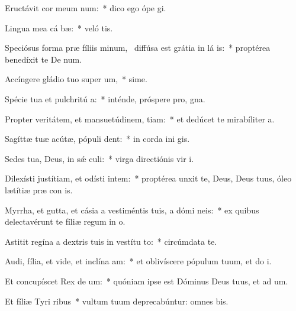 \item Eructávit cor meum  num:~* dico ego ópe  gi.
\item Lingua mea cá bæ:~* veló tis.
\item Speciósus forma præ fíliis minum,~\pscross{} diffúsa est grátia in lá is:~* proptérea benedíxit te De  num.
\item Accíngere gládio tuo super  um,~* sime.
\item Spécie tua et pulchritú a:~* inténde, próspere pro,  gna.
\item Propter veritátem, et mansuetúdinem,  tiam:~* et dedúcet te mirabíliter  a.
\item Sagíttæ tuæ acútæ, pópuli   dent:~* in corda ini gis.
\item Sedes tua, Deus, in sǽ culi:~* virga directiónis vir  i.
\item Dilexísti justítiam, et odísti intem:~* proptérea unxit te, Deus, Deus tuus, óleo lætítiæ præ con is.
\item Myrrha, et gutta, et cásia a vestiméntis tuis, a dómi neis:~* ex quibus delectavérunt te fíliæ regum in  o.
\item Astitit regína a dextris tuis in vestítu to:~* circúmdata te.
\item Audi, fília, et vide, et inclína  am:~* et oblivíscere pópulum tuum, et do  i.
\item Et concupíscet Rex de um:~* quóniam ipse est Dóminus Deus tuus, et ad um.
\item Et fíliæ Tyri  ribus~* vultum tuum deprecabúntur: omnes  bis.
